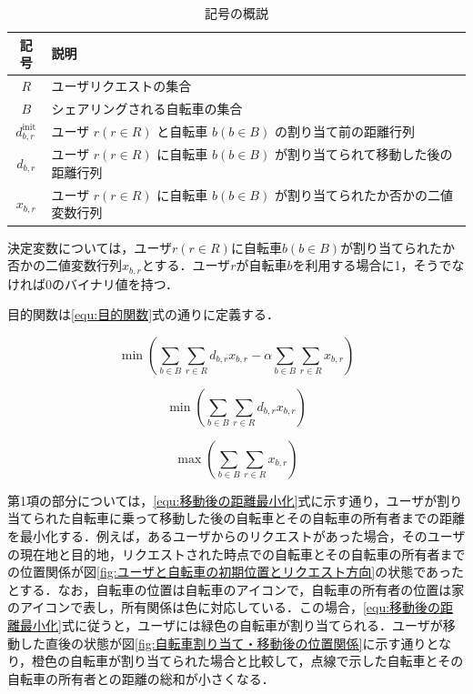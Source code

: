       \begin{table}[htbp]
        \caption{記号の概説}
        \label{tab:記号の概説}
        \centering
        \begin{tabular}{c p{6cm}}
          \hline 
          記号 & 説明 \\
          \hline
          $R$ & ユーザリクエストの集合 \\
          $B$ & シェアリングされる自転車の集合 \\
          $d^{\text{init}}_{b,r}$ & ユーザ $r(r \in R)$ と自転車 $b(b \in B)$ の割り当て前の距離行列\\
          $d_{b,r}$ & ユーザ $r (r \in R)$ に自転車 $b (b \in B)$ が割り当てられて移動した後の距離行列 \\
          $x_{b,r}$ & ユーザ $r (r \in R)$ に自転車 $b (b \in B)$ が割り当てられたか否かの二値変数行列 \\
          \hline
        \end{tabular}
      \end{table}
      
      \par 決定変数については，ユーザ$r (r \in R)$に自転車$b (b \in B)$が割り当てられたか否かの二値変数行列$x_{b,r}$とする．ユーザ$r$が自転車$b$を利用する場合に1，そうでなければ0のバイナリ値を持つ．
      
      \par 目的関数は\ref{equ:目的関数}式の通りに定義する．
      
      \begin{equation}\label{equ:目的関数}
        \min \left( \sum_{b \in B}\sum_{r \in R}d_{b,r}x_{b,r} - \alpha\sum_{b \in B}\sum_{r \in R}x_{b,r} \right)
      \end{equation}
      
      \begin{equation}\label{equ:移動後の距離最小化}
        \min \left( \sum_{b \in B}\sum_{r \in R}d_{b,r}x_{b,r} \right)
      \end{equation}
      
      \begin{equation}\label{equ:割り当て成功率最大化}
        \max \left(\sum_{b \in B}\sum_{r \in R}x_{b,r} \right)
      \end{equation}
      
      \par 第1項の部分については，\ref{equ:移動後の距離最小化}式に示す通り，ユーザが割り当てられた自転車に乗って移動した後の自転車とその自転車の所有者までの距離を最小化する．例えば，あるユーザからのリクエストがあった場合，そのユーザの現在地と目的地，リクエストされた時点での自転車とその自転車の所有者までの位置関係が図\ref{fig:ユーザと自転車の初期位置とリクエスト方向}の状態であったとする．なお，自転車の位置は自転車のアイコンで，自転車の所有者の位置は家のアイコンで表し，所有関係は色に対応している．この場合，\ref{equ:移動後の距離最小化}式に従うと，ユーザには緑色の自転車が割り当てられる．ユーザが移動した直後の状態が図\ref{fig:自転車割り当て・移動後の位置関係}に示す通りとなり，橙色の自転車が割り当てられた場合と比較して，点線で示した自転車とその自転車の所有者との距離の総和が小さくなる．
      
